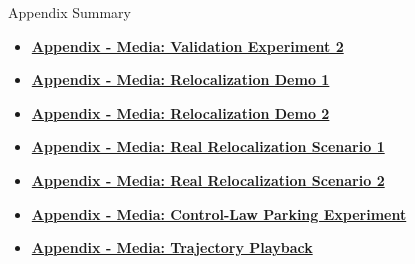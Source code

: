 \documentclass[aspectratio=169, 10pt]{beamer}
\newcounter{appendixstartframe}
\newif\ifinappendixframes
\newcommand{\startappendixframes}{%
  \setcounter{appendixstartframe}{\value{framenumber}}%
  \inappendixframestrue%
}
\begin{document}
\begin{frame}[noframenumbering]{Appendix Summary}
\transfade[duration=0.25]
\begin{outlinecard}
  \tiny
  \begin{itemize}
    \item \hyperlink{appendix-media-validation-exp2}{\textbf{Appendix - Media: Validation Experiment 2}}
    \item \hyperlink{appendix-media-reloc-demo1}{\textbf{Appendix - Media: Relocalization Demo 1}}
    \item \hyperlink{appendix-media-reloc-demo2}{\textbf{Appendix - Media: Relocalization Demo 2}}
    \item \hyperlink{appendix-media-reloc-real1}{\textbf{Appendix - Media: Real Relocalization Scenario 1}}
    \item \hyperlink{appendix-media-reloc-scn2}{\textbf{Appendix - Media: Real Relocalization Scenario 2}}
    \item \hyperlink{appendix-media-control-law}{\textbf{Appendix - Media: Control-Law Parking Experiment}}
    \item \hyperlink{appendix-media-traj1}{\textbf{Appendix - Media: Trajectory Playback}}
  \end{itemize}
\end{outlinecard}
\end{frame}
\startappendixframes

\end{document}
